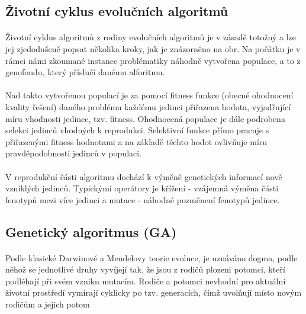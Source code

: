 \documentclass[bc,male,java,dept460]{diploma}		%
\begin{document}
\subsection{Životní cyklus evolučních algoritmů}


\paragraph*{}
Životní cyklus algoritmů z rodiny evolučních algoritmů je v zásadě totožný a lze jej zjedodušeně popsat několika kroky, jak je znázorněno na obr. Na počátku je v rámci námi zkoumané instance problématiky náhodně vytvořena populace, a to z genofondu, který příslučí danému alforitmu.

\paragraph*{}
Nad takto vytvořenou populací je za pomocí fitness funkce (obecné ohodnocení kvality řešení) daného problému každému jedinci přiřazena hodota, vyjadřující míru vhodnosti jedince, tzv. fitness. Ohodnocená populace je dále podrobena selekci jedinců vhodných k reprodukci. Selektivní funkce přímo pracuje s přiřazenými fitness hodnotami a na základě těchto hodot ovlivňuje míru pravděpodobnosti jedinců v populaci.

\paragraph*{}
V reprodukční části algoritmu dochází k výměně genetických informací nově vzniklých jedinců. Typickými operátory je křížení - vzájemná výměna části fenotypů mezi více jedinci a mutace - náhodné pozměnení fenotypů jedince.

\subsection{Genetický algoritmus (GA)}
\paragraph*{}
Podle klasické Darwinové a Mendelovy teorie evoluce, je uznáváno dogma, podle něhož se jednotlivé druhy vyvíjejí tak, že jsou z rodičů plozeni potomci, kteří podléhají při svém vzniku mutacím. Rodiče a potomci nevhodní pro aktuální životní prostředí vymírají cyklicky po tzv. generacích, čímž uvolňují místo novým rodičům a jejich potom
\end{document}
